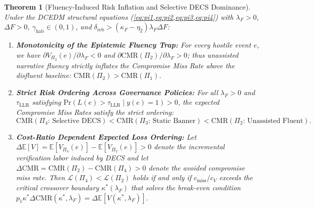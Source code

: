 \documentclass[11pt,a4paper]{article}
\newtheorem{theorem}{Theorem}
\begin{document}
\begin{theorem}[Fluency-Induced Risk Inflation and Selective DECS Dominance]
\label{thm:dcedm_dominance}
Under the DCEDM structural equations (\cref{eq:pi1,eq:pi2,eq:pi3,eq:pi4}) with $\lambda_F > 0$, $\Delta F > 0$, $\gamma_{\text{hab}} \in (0, 1)$, and $\delta_{\text{reb}} > (\kappa_F - \eta_2)\lambda_F \Delta F$:
\begin{enumerate}
  \item \textbf{Monotonicity of the Epistemic Fluency Trap:} For every hostile event $e$, we have $\partial V_{\Pi_2}(e) / \partial \lambda_F < 0$ and $\partial \text{CMR}(\Pi_2) / \partial \lambda_F > 0$; thus unassisted narrative fluency strictly inflates the Compromise Miss Rate above the disfluent baseline: $\text{CMR}(\Pi_2) > \text{CMR}(\Pi_1)$.
  \item \textbf{Strict Risk Ordering Across Governance Policies:} For all $\lambda_F > 0$ and $\tau_{\text{LLR}}$ satisfying $\text{Pr}(L(e) > \tau_{\text{LLR}} \mid y(e) = 1) > 0$, the expected Compromise Miss Rates satisfy the strict ordering:
  \begin{equation}
  \label{eq:cmr_ordering}
  \text{CMR}(\Pi_4\text{: Selective DECS}) < \text{CMR}(\Pi_3\text{: Static Banner}) < \text{CMR}(\Pi_2\text{: Unassisted Fluent}).
  \end{equation}
  \item \textbf{Cost-Ratio Dependent Expected Loss Ordering:} Let $\Delta\mathbb{E}[V] = \mathbb{E}[V_{\Pi_4}(e)] - \mathbb{E}[V_{\Pi_2}(e)] > 0$ denote the incremental verification labor induced by DECS and let $\Delta\text{CMR} = \text{CMR}(\Pi_2) - \text{CMR}(\Pi_4) > 0$ denote the avoided compromise miss rate. Then $\mathcal{L}(\Pi_4) < \mathcal{L}(\Pi_2)$ holds if and only if $c_{\text{miss}} / c_V$ exceeds the critical crossover boundary $\kappa^*(\lambda_F)$ that solves the break-even condition $p_1 \kappa^* \Delta\text{CMR}(\kappa^*, \lambda_F) = \Delta\mathbb{E}[V(\kappa^*, \lambda_F)]$.
\end{enumerate}
\end{theorem}
\end{document}
